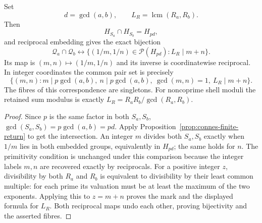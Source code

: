 \begin{theorem}
\label{thm:connes-common-pairs}
Set
\[
 d=\gcd(a,b),\qquad L_R=\operatorname{lcm}(R_a,R_b).
\]
Then
\[
 H_{S_a}\cap H_{S_b}=H_{pd},
\]
and reciprocal embedding gives the exact bijection
\[
 \mathcal Q_a\cap\mathcal Q_b
 \longleftrightarrow
 \{(1/m,1/n)\in\mathcal P(H_{pd}):L_R\mid m+n\}.
\]
Its map is $(m,n)\mapsto(1/m,1/n)$ and its inverse is coordinatewise
reciprocal.  In integer coordinates the common pair set is precisely
\[
 \{(m,n):m\mid p\gcd(a,b),\ n\mid p\gcd(a,b),\
          \gcd(m,n)=1,\ L_R\mid m+n\}.
\]
The fibres of this correspondence are singletons.  For noncoprime shell
moduli the retained sum modulus is exactly
$L_R=R_aR_b/\gcd(R_a,R_b)$.
\end{theorem}
\begin{proof}
Since $p$ is the same factor in both $S_a,S_b$,
$\gcd(S_a,S_b)=p\gcd(a,b)=pd$.  Apply
Proposition~\ref{prop:connes-finite-return} to get the intersection.
An integer $m$ divides both $S_a,S_b$ exactly when $1/m$ lies in both
embedded groups, equivalently in $H_{pd}$; the same holds for $n$.
The primitivity condition is unchanged under this comparison because
the integer labels $m,n$ are recovered exactly by reciprocals.
For a positive integer $z$, divisibility by both $R_a$ and $R_b$ is
equivalent to divisibility by their least common multiple: for each prime
its valuation must be at least the maximum of the two exponents.
Applying this to $z=m+n$ proves the mark and the displayed formula for
$L_R$.  Both reciprocal maps undo each other, proving bijectivity and
the asserted fibres.
\end{proof}

